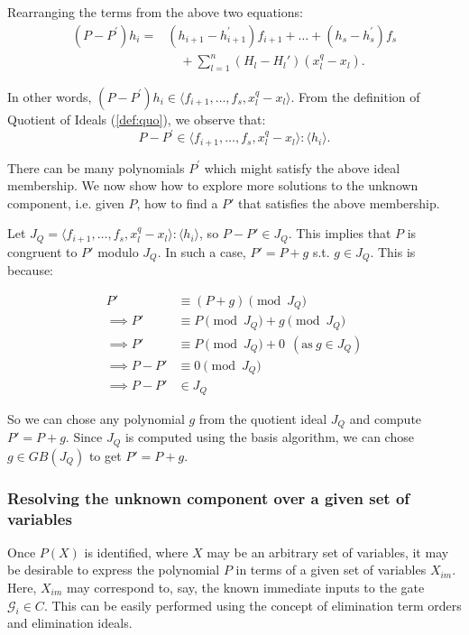 Rearranging the terms from the above two equations:
\begin{equation}
  \begin{split}
(P-P^{'})h_i = &
    (h_{i+1}-h_{i+1}^{'})f_{i+1}+\dots+(h_{s}-h_{s}^{'})f_s\\
    & \quad + \sum_{l=1}^n (H_l-H_l') (x_l^q-x_l).
  \end{split}
\end{equation}

In other words, 
$(P-P^{'})h_i \in \langle f_{i+1},\dots,f_s,x_l^q-x_l\rangle$. 
From the definition of Quotient of Ideals (\autoref{def:quo}), we
observe that:
\vspace{0.1in}
\begin{equation}
\label{quotcomp}
P-P^{'} \in \langle f_{i+1},\dots,f_s,x_l^q-x_l\rangle : \langle h_i\rangle.
\end{equation}

There can be many polynomials $P^{'}$ which might satisfy the above
ideal membership. We now show how to explore more
solutions to the unknown component, i.e. given $P$, how to find a $P'$
that satisfies the above membership.  

Let $J_{Q} = \langle f_{i+1},\dots,f_s,x_l^q-x_l\rangle : \langle
h_i\rangle$, so $P - P' \in J_Q$. This implies that $P$ is congruent
to $P'$ modulo $J_Q$. In such a case, $P' = P + g$ s.t. $g\in
J_Q$. This is because:

\begin{align*}
  P' &\equiv (P + g) \pmod{J_Q}\\
\implies  P' &\equiv P \pmod{ J_Q} + g \pmod{J_Q}\\
\implies  P' &\equiv P \pmod{ J_Q} + 0 ~~(\text{as} ~g \in J_Q)  \\
\implies  P-P' &\equiv 0 \pmod{ J_Q}\\
\implies  P-P' & \in { J_Q}
\end{align*}

So we can chose any polynomial $g$ from the quotient
ideal $J_Q$ and compute $P' = P + g$. Since $J_Q$ is computed using
the \Grobner basis algorithm, we can chose $g \in GB(J_Q)$ to get $P'
= P + g$.

\subsubsection{Resolving the unknown component over a given set of
  variables} \label{ssec:num1} Once $P(X)$ is identified, where $X$ may be an
arbitrary set of variables, it may be desirable to express the
polynomial $P$ in terms of a given set of variables $X_{im}$. Here,
$X_{im}$ may correspond to, say, the known immediate inputs to the
gate $\mathcal{G}_i \in C$. This can be easily performed using the
concept of elimination term orders and elimination ideals.

